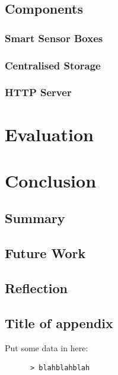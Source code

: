 \documentclass{l4proj}
\begin{document}
\section{Components}
\subsection{Smart Sensor Boxes}
\subsection{Centralised Storage}
\subsection{HTTP Server}


\chapter{Evaluation}



\chapter{Conclusion}
\section{Summary}
\section{Future Work}
\section{Reflection}


\begin{appendices}

\chapter{Title of appendix}
Put some data in here:
\begin{verbatim}
      > blahblahblah
\end{verbatim}

\end{appendices}




\end{document}

